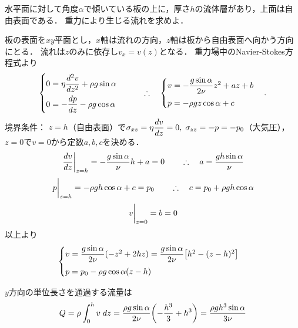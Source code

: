 
\begin{mondai}{}{}
水平面に対して角度$\alpha$で傾いている板の上に，厚さ$h$の流体層があり，上面は自由表面である．
重力により生じる流れを求めよ．
\end{mondai}
\begin{kaitou}
板の表面を$xy$平面とし，$x$軸は流れの方向，$z$軸は板から自由表面へ向かう方向にとる．
流れは$z$のみに依存し$v_x=v(z)$となる．
重力場中のNavier-Stokes方程式より
\[
    \begin{cases}
        0 = \eta \ddv[2]{v}{z} + \rho g \sin\alpha \\[7pt]
        0 = -\ddv{p}{z} - \rho g \cos\alpha \\
    \end{cases}
    \qquad\yueni
    \begin{cases}
        v = - \dfrac{g\sin\alpha}{2\nu} z^2 + az + b \\[7pt]
        p = -\rho gz\cos\alpha + c \\
    \end{cases} .
\]
境界条件：
$z=h$（自由表面）で$\sigma_{xz}=\eta\ddv{v}{z}=0,\; \sigma_{zz}=-p=-p_0$（大気圧），
$z=0$で$v=0$から定数$a,b,c$を決める．
\[
    \eval{\ddv{v}{z}}_{z=h} = - \frac{g\sin\alpha}{\nu} h + a = 0
    \qquad\yueni a = \frac{gh \sin\alpha}{\nu}
\]
\[
    \eval{p}_{z=h} = -\rho gh\cos\alpha + c = p_0
    \qquad\yueni c = p_0 + \rho gh\cos\alpha
\]
\[
    \eval{v}_{z=0} = b = 0
\]
以上より
\[
    \begin{cases}
        v = \dfrac{g\sin\alpha}{2\nu} (-z^2+2hz) = \dfrac{g\sin\alpha}{2\nu} \bqty{ h^2 - (z-h)^2 } \\[7pt]
        p = p_0 - \rho g \cos\alpha (z-h) \\
    \end{cases}    
\]

$y$方向の単位長さを通過する流量は
\[
    Q = \rho \int_0^h v \; dz
    = \dfrac{\rho g\sin\alpha}{2\nu} \pqty{ -\frac{h^3}{3} + h^3 }
    = \frac{\rho gh^3\sin\alpha}{3\nu}
\]




 
\end{kaitou}








